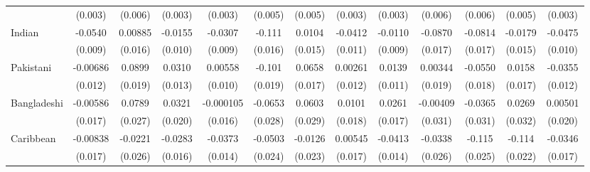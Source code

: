 \begin{sidewaystable}[htbp]
\begin{tabular}{l*{12}{c}}
               &  (0.003)         &  (0.006)         &  (0.003)         &  (0.003)         &  (0.005)         &  (0.005)         &  (0.003)         &  (0.003)         &  (0.006)         &  (0.006)         &  (0.005)         &  (0.003)         \\
\addlinespace
Indian         &  -0.0540\sym{***}&  0.00885         &  -0.0155         &  -0.0307\sym{***}&   -0.111\sym{***}&   0.0104         &  -0.0412\sym{***}&  -0.0110         &  -0.0870\sym{***}&  -0.0814\sym{***}&  -0.0179         &  -0.0475\sym{***}\\
               &  (0.009)         &  (0.016)         &  (0.010)         &  (0.009)         &  (0.016)         &  (0.015)         &  (0.011)         &  (0.009)         &  (0.017)         &  (0.017)         &  (0.015)         &  (0.010)         \\
\addlinespace
Pakistani      & -0.00686         &   0.0899\sym{***}&   0.0310\sym{*}  &  0.00558         &   -0.101\sym{***}&   0.0658\sym{***}&  0.00261         &   0.0139         &  0.00344         &  -0.0550\sym{**} &   0.0158         &  -0.0355\sym{**} \\
               &  (0.012)         &  (0.019)         &  (0.013)         &  (0.010)         &  (0.019)         &  (0.017)         &  (0.012)         &  (0.011)         &  (0.019)         &  (0.018)         &  (0.017)         &  (0.012)         \\
\addlinespace
Bangladeshi    & -0.00586         &   0.0789\sym{**} &   0.0321         &-0.000105         &  -0.0653\sym{*}  &   0.0603\sym{*}  &   0.0101         &   0.0261         & -0.00409         &  -0.0365         &   0.0269         &  0.00501         \\
               &  (0.017)         &  (0.027)         &  (0.020)         &  (0.016)         &  (0.028)         &  (0.029)         &  (0.018)         &  (0.017)         &  (0.031)         &  (0.031)         &  (0.032)         &  (0.020)         \\
\addlinespace
Caribbean      & -0.00838         &  -0.0221         &  -0.0283         &  -0.0373\sym{**} &  -0.0503\sym{*}  &  -0.0126         &  0.00545         &  -0.0413\sym{**} &  -0.0338         &   -0.115\sym{***}&   -0.114\sym{***}&  -0.0346\sym{*}  \\
               &  (0.017)         &  (0.026)         &  (0.016)         &  (0.014)         &  (0.024)         &  (0.023)         &  (0.017)         &  (0.014)         &  (0.026)         &  (0.025)         &  (0.022)         &  (0.017)         \\

\end{tabular}
\end{sidewaystable}
